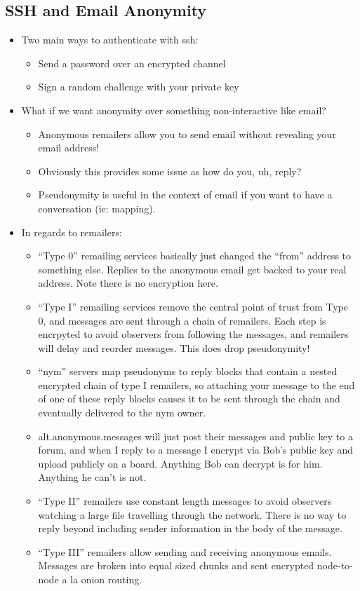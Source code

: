\documentclass{article}
\begin{document}
\subsection{SSH and Email Anonymity}
\begin{itemize}
    \item Two main ways to authenticate with ssh:
        \begin{itemize}
            \item Send a password over an encrypted channel
            \item Sign a random challenge with your private key
        \end{itemize}
    \item What if we want anonymity over something non-interactive like email?
        \begin{itemize}
            \item Anonymous remailers allow you to send email without revealing your email address!
            \item Obviously this provides some issue as how do you, uh, reply?
            \item Pseudonymity is useful in the context of email if you want to have a conversation (ie: mapping).
        \end{itemize}
    \item In regards to remailers:
        \begin{itemize}
            \item ``Type 0'' remailing services basically just changed the ``from'' address to something else.  Replies to the anonymous email get backed to your real address.  Note there is no encryption here.
            \item ``Type I'' remailing services remove the central point of trust from Type 0, and messages are sent through a chain of remailers.  Each step is encrpyted to avoid observers from following the messages, and remailers will delay and reorder messages.  This does drop pseudonymity!
            \item ``nym'' servers map pseudonyms to reply blocks that contain a nested encrypted chain of type I remailers, so attaching your message to the end of one of these reply blocks causes it to be sent through the chain and eventually delivered to the nym owner.
            \item alt.anonymous.messages will just post their messages and public key to a forum, and when I reply to a message I encrypt via Bob's public key and upload publicly on a board.  Anything Bob can decrypt is for him.  Anything he can't is not.
            \item ``Type II'' remailers use constant length messages to avoid observers watching a large file travelling through the network.  There is no way to reply beyond including sender information in the body of the message.
            \item ``Type III'' remailers allow sending and receiving anonymous emails.  Messages are broken into equal sized chunks and sent encrypted node-to-node a la onion routing.
        \end{itemize}
\end{itemize}
\end{document}

